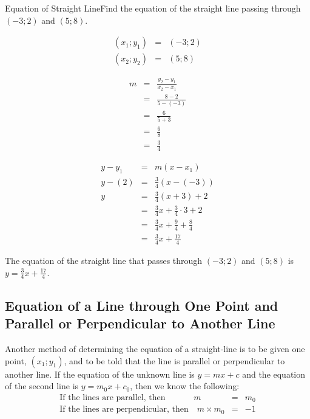\begin{wex}{Equation of Straight Line}{Find the equation of the straight line passing through $(-3;2)$ and $(5;8)$.}{
\begin{eqnarray*}
(x_1;y_1)&=&(-3;2)\\
(x_2;y_2)&=&(5;8)
\end{eqnarray*}

\begin{eqnarray*}
m &=&\frac{y_2-y_1}{x_2-x_1}\\
&=&\frac{8-2}{5-(-3)}\\
&=&\frac{6}{5+3}\\
&=&\frac{6}{8}\\
&=&\frac{3}{4}
\end{eqnarray*}

\begin{eqnarray*}
y-y_1&=&m(x-x_1)\\
y-(2)&=&\frac{3}{4}(x-(-3))\\
y&=&\frac{3}{4}(x+3) + 2\\
&=&\frac{3}{4}x + \frac{3}{4} \cdot 3 + 2\\
&=&\frac{3}{4}x + \frac{9}{4} + \frac{8}{4}\\
&=&\frac{3}{4}x + \frac{17}{4}
\end{eqnarray*}

The equation of the straight line that passes through $(-3;2)$ and $(5;8)$ is $y=\frac{3}{4}x + \frac{17}{4}$.}
\end{wex}

\subsection{Equation of a Line through One Point and Parallel or Perpendicular to Another Line}

Another method of determining the equation of a straight-line is to be given one point, $(x_1;y_1)$, and to be told that the line is parallel or perpendicular to another line. If the equation of the unknown line is $y=mx+c$ and the equation of the second line is $y=m_0x+c_0$, then we know the following:
\begin{eqnarray}
\mbox{If the lines are parallel, then }\quad\quad\quad m&=& m_0\\
\mbox{If the lines are perpendicular, then}\quad m \times m_0&=& -1
\end{eqnarray}

